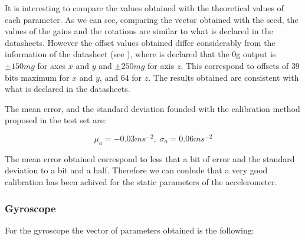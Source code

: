 \documentclass[conference]{IEEEtran}
\newcommand{\refp}[1]{(\ref{#1})}
\begin{document}
It is interesting to compare the values obtained with the theoretical values of each parameter. As we can see, comparing the vector obtained with the seed, the values of the gains and the rotations are similar to what is declared in the datasheets. However the offset values obtained differ considerably from the information of the datasheet (see \cite{bib:acc_data}), where is declared that the 0g output is $\pm 150 mg$ for axes $x$ and $y$ and $\pm 250mg$ for axis $z$. This correspond to offsets of $39$ bits maximum for $x$ and $y$, and $64$ for $z$. The results obtained are consistent with what is declared in the datasheets. 

The mean error, and the standard deviation founded with the calibration method proposed in the test set are:

\begin{equation}
\mu_a = -0.03ms^{-2}, \; \sigma_a = 0.06ms^{-2}
\end{equation}

The mean error obtained correspond to less that a bit of error and the standard deviation to a bit and a half. Therefore we can conlude that a very good calibration has been achived for the static parameters of the accelerometer.\\



\subsubsection{Gyroscope}
For the gyroscope the vector of parameters obtained is the following:
\end{document}
